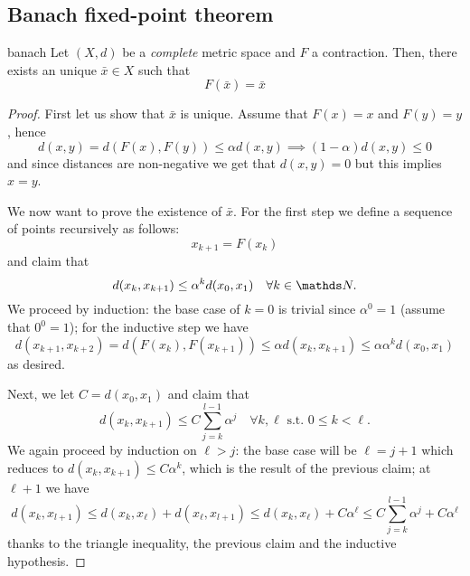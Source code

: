 \documentclass[12pt]{extarticle}
\numberwithin{equation}{section}
\begin{document}
\subsection{Banach fixed-point theorem}

\begin{theorem}{}{banach}
    Let $(X, d)$ be a \emph{complete} metric space and $F$ a contraction.
    Then, there exists an unique $\bar x \in X$ such that
    \begin{equation}
        F(\bar x) = \bar x
    \end{equation}
\end{theorem}

\begin{proof}
    First let us show that $\bar x$ is unique.
    Assume that $F(x) = x$ and $F(y) = y$, hence
    \begin{equation}
        d(x, y) = d(F(x), F(y)) \leq \alpha d(x, y) \implies (1-\alpha) d(x, y) \leq 0
    \end{equation}
    and since distances are non-negative we get that $d(x, y) = 0$ but this implies $x = y$.

    We now want to prove the existence of $\bar x$.
    For the first step we define a sequence of points recursively as follows:
    \begin{equation}
        x_{k + 1} = F(x_k)
    \end{equation}
    and claim that
    \begin{equation}
        d(x_k, x_{k+1}) \leq \alpha^k d(x_0, x_1) \quad \forall k \in \N .
    \end{equation}
    We proceed by induction: the base case of $k = 0$ is trivial since $\alpha^0 = 1$ (assume that $0^0=1$);
    for the inductive step we have
    \begin{equation}
        d(x_{k+1}, x_{k+2}) = d(F(x_k), F(x_{k+1})) \leq \alpha d(x_k, x_{k+1}) \leq \alpha \alpha^k d(x_0, x_1)
    \end{equation}
    as desired.

    Next, we let $C = d(x_0, x_1)$ and claim that
    \begin{equation}
        d(x_k, x_{k+1}) \leq C \sum_{j = k}^{l-1} \alpha^j \quad \forall k, \ell \text{ s.t. } 0 \leq k < \ell.
    \end{equation}
    We again proceed by induction on $\ell > j$:
    the base case will be $\ell = j + 1$ which reduces to $d(x_k, x_{k+1}) \leq C \alpha^k$, which is the result of the previous claim;
    at $\ell + 1$ we have
    \begin{equation}
        d(x_k, x_{l+1}) \leq d(x_k, x_\ell) + d(x_\ell, x_{l + 1}) \leq d(x_k, x_\ell) + C \alpha^\ell \leq C\sum_{j = k}^{l-1} \alpha^j + C \alpha^\ell
    \end{equation}
    thanks to the triangle inequality, the previous claim and the inductive hypothesis.


\end{proof}
\end{document}
